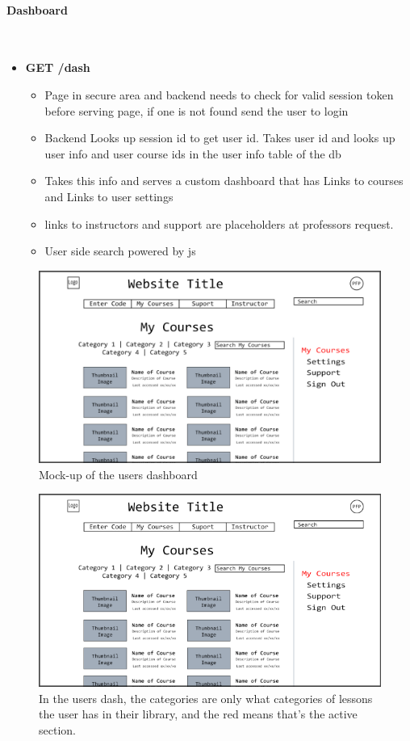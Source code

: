 \documentclass{article}
\begin{document}
\paragraph{Dashboard}\\
\begin{itemize}
    \item \textbf{GET /dash}
        \begin{itemize}
        \item Page in secure area and backend needs to check for valid session token before serving page, if one is not found send the user to login
        \item Backend Looks up session id to get user id. Takes user id and looks up user info and user course ids in the user info table of the db
        \item Takes this info and serves a custom dashboard that has Links to courses and Links to user settings
        \item links to instructors and support are placeholders at professors request.
        \item User side search powered by js
    \end{itemize}
\end{itemize}
\begin{figure}[h]
    \caption{Mock-up of the users dashboard}
    \includegraphics[width=\textwidth]{user_page}
\end{figure}
\begin{figure}[h]
    \caption{In the users dash, the categories are only what categories of
    lessons the user has in their library, and the red means that's the active
    section.}
    \includegraphics[width=\textwidth]{user_page_red}
\end{figure}
\end{document}
